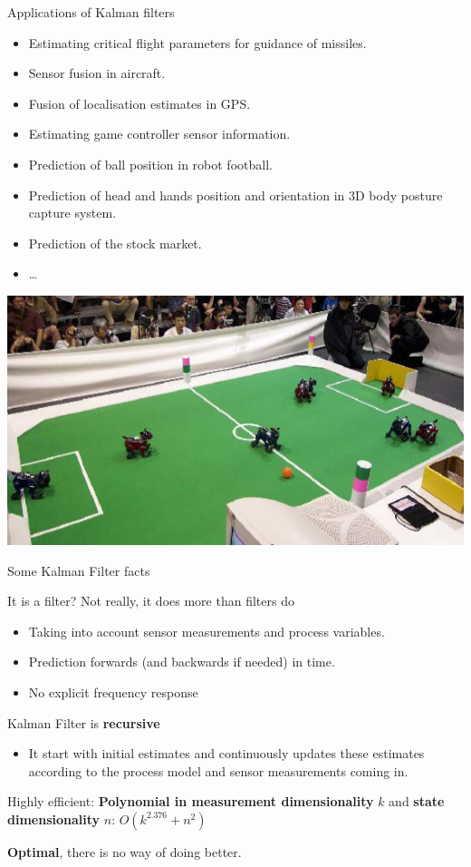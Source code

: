 \documentclass[compress]{beamer}
\begin{document}
\begin{frame}{Applications of Kalman filters}

    \begin{itemize}
        \item Estimating critical flight parameters for guidance of missiles.
        \item Sensor fusion in aircraft.
        \item Fusion of localisation estimates in GPS.
        \item Estimating game controller sensor information.
        \item Prediction of ball position in robot football.
        \item Prediction of head and hands position and orientation in 3D body
            posture capture system.
        \item Prediction of the stock market.
        \item \ldots{}
    \end{itemize}

    \begin{center}
        \includegraphics[width=0.5\linewidth]{robot_football}
    \end{center}

\end{frame}

\begin{frame}{Some Kalman Filter facts}

    It is a filter? Not really, it does more than filters do

    \begin{itemize}
        \item Taking into account sensor measurements and process variables.
        \item Prediction forwards (and backwards if needed) in time.
        \item No explicit frequency response
    \end{itemize}

    Kalman Filter is \textbf{recursive}

    \begin{itemize}
        \item It start with initial estimates and continuously updates these
            estimates according to the process model and sensor measurements coming
            in.
    \end{itemize}

    Highly efficient: \textbf{Polynomial in measurement dimensionality} $k$ and
    \textbf{state dimensionality} $n$: $O(k^{2.376} + n^2)$

    \textbf{Optimal}, \ie there is no way of doing better.

\end{frame}
\end{document}
